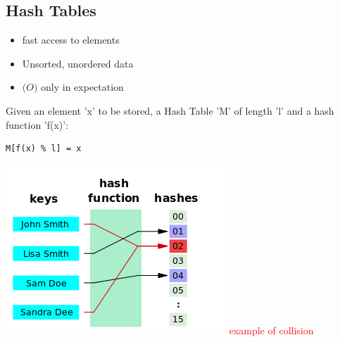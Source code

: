 \subsection{Hash Tables}
    \begin{minipage}{0.49\linewidth}
        \begin{itemize}
            \item fast access to elements
            \item Unsorted, unordered data
            \item $\mathcal(O)$ only in expectation
        \end{itemize}
        Given an element 'x' to be stored, a Hash Table 'M' of length 'l' and a hash function 'f(x)':
        \begin{lstlisting}
M[f(x) % l] = x
\end{lstlisting}
    \end{minipage}
    \begin{minipage}{0.49\linewidth}
        \includegraphics[width = 0.95\linewidth]{src/4_data_structure/images/hash_function.png}
        \textcolor{red}{example of collision}
    \end{minipage}

